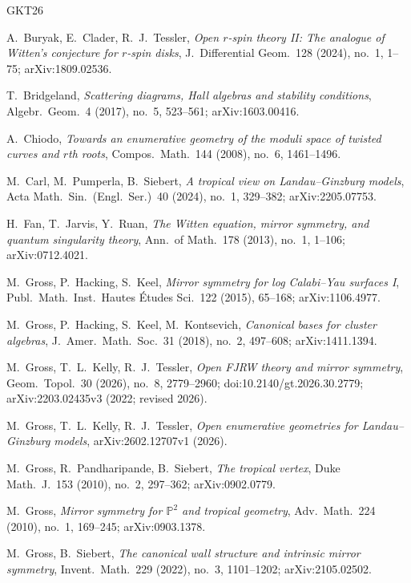 \documentclass[11pt]{amsart}
\theoremstyle{definition}
\theoremstyle{remark}
\newcommand{\PP}{\mathbb{P}}
\begin{document}
\begin{thebibliography}{GKT26}

 A.~Buryak, E.~Clader, R.~J.~Tessler,
\emph{Open $r$-spin theory II: The analogue of Witten's conjecture for
$r$-spin disks}, J.\ Differential Geom.\ 128 (2024), no.~1, 1--75;
arXiv:1809.02536.

 T.~Bridgeland,
\emph{Scattering diagrams, Hall algebras and stability conditions},
Algebr.\ Geom.\ 4 (2017), no.~5, 523--561; arXiv:1603.00416.

 A.~Chiodo,
\emph{Towards an enumerative geometry of the moduli space of twisted curves
and $r$th roots}, Compos.\ Math.\ 144 (2008), no.~6, 1461--1496.

 M.~Carl, M.~Pumperla, B.~Siebert,
\emph{A tropical view on Landau--Ginzburg models},
Acta Math.\ Sin.\ (Engl.\ Ser.)\ 40 (2024), no.~1, 329--382;
arXiv:2205.07753.

 H.~Fan, T.~Jarvis, Y.~Ruan,
\emph{The Witten equation, mirror symmetry, and quantum singularity theory},
Ann.\ of Math.\ 178 (2013), no.~1, 1--106; arXiv:0712.4021.

 M.~Gross, P.~Hacking, S.~Keel,
\emph{Mirror symmetry for log Calabi--Yau surfaces I},
Publ.\ Math.\ Inst.\ Hautes \'Etudes Sci.\ 122 (2015), 65--168;
arXiv:1106.4977.

 M.~Gross, P.~Hacking, S.~Keel, M.~Kontsevich,
\emph{Canonical bases for cluster algebras}, J.\ Amer.\ Math.\ Soc.\ 31
(2018), no.~2, 497--608; arXiv:1411.1394.

 M.~Gross, T.~L.~Kelly, R.~J.~Tessler,
\emph{Open FJRW theory and mirror symmetry}, Geom.\ Topol.\ 30 (2026),
no.~8, 2779--2960; doi:10.2140/gt.2026.30.2779;
arXiv:2203.02435v3 (2022; revised 2026).

 M.~Gross, T.~L.~Kelly, R.~J.~Tessler,
\emph{Open enumerative geometries for Landau--Ginzburg models},
arXiv:2602.12707v1 (2026).

 M.~Gross, R.~Pandharipande, B.~Siebert,
\emph{The tropical vertex}, Duke Math.\ J.\ 153 (2010), no.~2, 297--362;
arXiv:0902.0779.

 M.~Gross,
\emph{Mirror symmetry for $\PP^{2}$ and tropical geometry},
Adv.\ Math.\ 224 (2010), no.~1, 169--245; arXiv:0903.1378.

 M.~Gross, B.~Siebert,
\emph{The canonical wall structure and intrinsic mirror symmetry},
Invent.\ Math.\ 229 (2022), no.~3, 1101--1202; arXiv:2105.02502.


\end{thebibliography}
\end{document}
